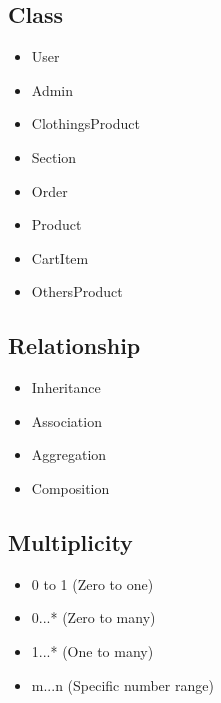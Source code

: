 \subsection{Class}
\begin{itemize}
    \item User
    \item Admin
    \item ClothingsProduct
    \item Section
    \item Order
    \item Product
    \item CartItem
     \item OthersProduct
    
\end{itemize}


\subsection{Relationship}

\begin{itemize}
    \item Inheritance
    \item Association
    \item Aggregation
    \item Composition  
\end{itemize}
  
  
 \subsection{Multiplicity}
 \begin{itemize}
     \item 0 to 1 (Zero to one)
     \item 0...* (Zero to many) 
     \item 1...* (One to many)
     \item m...n (Specific number range)
     
 \end{itemize}
